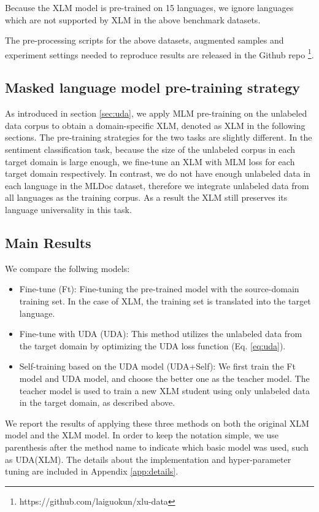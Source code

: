 \documentclass{article} \usepackage{iclr2020_conference,times}
\begin{document}
Because the XLM model is pre-trained on 15 languages, we ignore languages which are not supported by XLM in the above benchmark datasets. 

The pre-processing scripts for the above datasets, augmented samples and experiment settings needed to reproduce results are released in the Github repo \footnote{https://github.com/laiguokun/xlu-data}. 

\subsection{Masked language model pre-training strategy}

As introduced in section \ref{sec:uda}, we apply MLM pre-training on the unlabeled data corpus to obtain a domain-specific XLM, denoted as XLM in the following sections. The pre-training strategies for the two tasks are slightly different. 
In the sentiment classification task, because the size of the unlabeled corpus in each target domain is large enough, we fine-tune an XLM with MLM loss for each target domain respectively. 
In contrast, we do not have enough unlabeled data in each language in the MLDoc dataset, therefore we integrate unlabeled data from all languages as the training corpus.
As a result the XLM still preserves its language universality in this task.

\subsection{Main Results}
\label{sec:results}
We compare the follwing models:

\begin{itemize}[leftmargin=*]
    \item Fine-tune (Ft): Fine-tuning the pre-trained model with the source-domain training set.  In the case of XLM, the training set is translated into the target language.
    \item Fine-tune with UDA (UDA): This method utilizes the unlabeled data from the target domain by optimizing the UDA loss function (Eq. \eqref{eq:uda}).
    \item Self-training based on the UDA model (UDA+Self): We first train the Ft model and UDA model, and choose the better one as the teacher model. The teacher model is used to train a new XLM student using only unlabeled data  in the target domain, as described above.
\end{itemize}

We report the results of applying these three methods on both the original XLM model and the XLM model. In order to keep the notation simple, we use parenthesis after the method name to indicate which basic model was used, such as UDA(XLM).  The details about the implementation and hyper-parameter tuning are included in Appendix \ref{app:details}.
\end{document}
